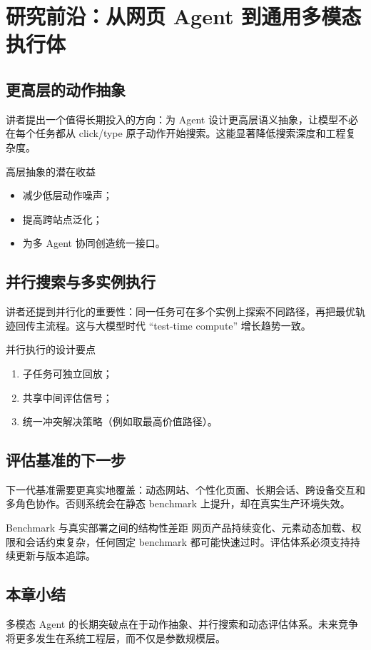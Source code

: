 \section{研究前沿：从网页 Agent 到通用多模态执行体}

\subsection{更高层的动作抽象}
讲者提出一个值得长期投入的方向：为 Agent 设计更高层语义抽象，让模型不必在每个任务都从 click/type 原子动作开始搜索。这能显著降低搜索深度和工程复杂度。

\begin{importantbox}{高层抽象的潜在收益}
\begin{itemize}
    \item 减少低层动作噪声；
    \item 提高跨站点泛化；
    \item 为多 Agent 协同创造统一接口。
\end{itemize}
\end{importantbox}

\subsection{并行搜索与多实例执行}
讲者还提到并行化的重要性：同一任务可在多个实例上探索不同路径，再把最优轨迹回传主流程。这与大模型时代 ``test-time compute'' 增长趋势一致。

\begin{knowledgebox}{并行执行的设计要点}
\begin{enumerate}
    \item 子任务可独立回放；
    \item 共享中间评估信号；
    \item 统一冲突解决策略（例如取最高价值路径）。
\end{enumerate}
\end{knowledgebox}

\subsection{评估基准的下一步}
下一代基准需要更真实地覆盖：动态网站、个性化页面、长期会话、跨设备交互和多角色协作。否则系统会在静态 benchmark 上提升，却在真实生产环境失效。

\begin{warningbox}{Benchmark 与真实部署之间的结构性差距}
网页产品持续变化、元素动态加载、权限和会话约束复杂，任何固定 benchmark 都可能快速过时。评估体系必须支持持续更新与版本追踪。
\end{warningbox}

\subsection{本章小结}
多模态 Agent 的长期突破点在于动作抽象、并行搜索和动态评估体系。未来竞争将更多发生在系统工程层，而不仅是参数规模层。

